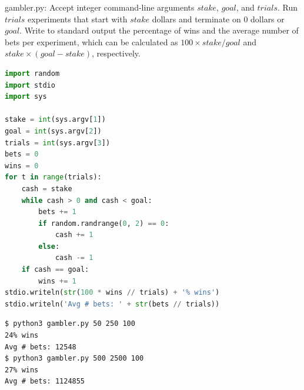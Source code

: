 \documentclass[8pt,a4paper,compress]{beamer}
\begin{document}
\begin{frame}[fragile]
\pause

\begin{framed}
\tiny gambler.py: Accept integer command-line arguments $stake$, $goal$, and $trials$. Run $trials$ experiments that start with $stake$ dollars and terminate on 0 dollars or $goal$. Write to standard output the percentage of wins and the average number of bets per experiment, which can be calculated as $100 \times stake / goal$ and $stake \times (goal - stake)$, respectively.
\end{framed}

\begin{minipage}{200pt}
\begin{lstlisting}[language=Python]
import random
import stdio
import sys

stake = int(sys.argv[1])
goal = int(sys.argv[2])
trials = int(sys.argv[3])
bets = 0
wins = 0
for t in range(trials):
    cash = stake
    while cash > 0 and cash < goal:
        bets += 1
        if random.randrange(0, 2) == 0:
            cash += 1
        else:
            cash -= 1
    if cash == goal:
        wins += 1
stdio.writeln(str(100 * wins // trials) + '% wins')
stdio.writeln('Avg # bets: ' + str(bets // trials))
\end{lstlisting}
\end{minipage}%
\begin{minipage}{100pt}
\hfill {}
\end{minipage}

\pause

\begin{lstlisting}[language={}]
$ python3 gambler.py 50 250 100
24% wins
Avg # bets: 12548
$ python3 gambler.py 500 2500 100
27% wins
Avg # bets: 1124855
\end{lstlisting}
\end{frame}
\end{document}
